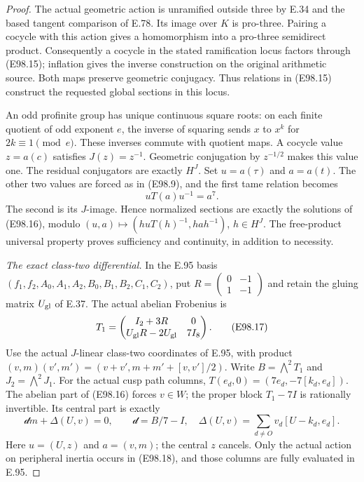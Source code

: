 \begin{proof}
The actual geometric action is unramified outside three
by E.34 and the based tangent comparison of E.78. Its
image over $K$ is pro-three. Pairing a cocycle with this
action gives a homomorphism into a pro-three semidirect
product. Consequently a cocycle in the stated
ramification locus factors through (E98.15); inflation
gives the inverse construction on the original
arithmetic source. Both maps preserve geometric
conjugacy. Thus relations in (E98.15) construct the
requested global sections in this locus.

An odd profinite group has unique continuous square
roots: on each finite quotient of odd exponent $e$,
the inverse of squaring sends $x$ to $x^k$ for
$2k\equiv1\pmod e$. These inverses commute with
quotient maps. A cocycle value $z=a(c)$ satisfies
$J(z)=z^{-1}$. Geometric conjugation by $z^{-1/2}$
makes this value one. The residual conjugators are
exactly $H^J$. Set $u=a(\tau)$ and $a=a(t)$.
The other two values are forced as in (E98.9), and
the first tame relation becomes
\[
                 uT(a)u^{-1}=a^7.
 \tag{E98.16}
\]
The second is its $J$-image. Hence normalized sections
are exactly the solutions of (E98.16), modulo
$(u,a)\mapsto(huT(h)^{-1},hah^{-1})$, $h\in H^J$.
The free-product universal property proves sufficiency
and continuity, in addition to necessity.

\emph{The exact class-two differential.}
In the E.95 basis $(f_1,f_2,A_0,A_1,A_2,B_0,B_1,B_2,C_1,C_2)$,
put $R=\left(\begin{smallmatrix}0&-1\\1&-1\end{smallmatrix}\right)$
and retain the gluing matrix $U_{\rm gl}$ of E.37.
The actual abelian Frobenius is
\[
 T_1=\begin{pmatrix}I_2+3R&0\\
        U_{\rm gl}R-2U_{\rm gl}&7I_8\end{pmatrix}.
 \tag{E98.17}
\]
Use the actual $J$-linear class-two coordinates of E.95,
with product $(v,m)(v',m')=(v+v',m+m'+[v,v']/2)$.
Write $B=\bigwedge^2T_1$ and $J_2=\bigwedge^2J_1$.
For the actual cusp path columns,
$T(e_d,0)=(7e_d,-7[k_d,e_d])$.
The abelian part of (E98.16) forces $v\in W$;
the proper block $T_1-7I$ is rationally invertible.
Its central part is exactly
\[
 \mathcal d m+\Delta(U,v)=0,\qquad
 \mathcal d=B/7-I,
 \quad\Delta(U,v)=\sum_{d\ne O}v_d[U-k_d,e_d].
 \tag{E98.18}
\]
Here $u=(U,z)$ and $a=(v,m)$; the central $z$ cancels.
Only the actual action on peripheral inertia occurs
in (E98.18), and those columns are fully evaluated in E.95.


\end{proof}
